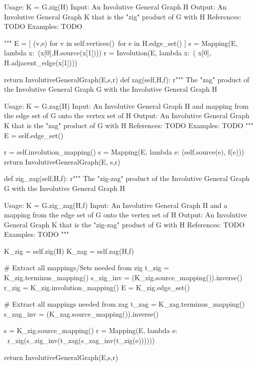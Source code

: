 \begin{sageblock}
        Usage: K = G.zig(H)         
        Input: An Involutive General Graph H
        Output: An Involutive General Graph 
        K that is the "zig" 
        product of G with H
        References: TODO
        Examples: TODO

        """
        E = [ (v,e) for v in self.vertices()\
        for e in H.edge_set() ]
        s = Mapping(E, lambda x:\
        (x[0],H.source(x[1])))
        r = Involution(E, lambda x:\
        ( x[0], H.adjacent_edge(x[1])))

        return InvolutiveGeneralGraph(E,s,r)
    def zag(self,H,f):
        r"""
        The "zag" product of the Involutive 
        General Graph G with the 
        Involutive General Graph H

        Usage: K = G.zag(H)
        Input: An Involutive General Graph H 
        and mapping from the edge set 
        of G onto the vertex set of H
        Output: An Involutive General Graph K 
        that is the "zag" product of 
        G with H
        References: TODO
        Examples: TODO
        """
        E = self.edge_set()
        
        r = self.involution_mapping()
        s = Mapping(E, lambda e: (self.source(e), f(e)))
        return InvolutiveGeneralGraph(E, s,r)
        
    def zig_zag(self,H,f):
        r"""
        The "zig-zag" product of the Involutive 
        General Graph G with the Involutive General Graph H

        Usage: K = G.zig_zag(H,f)
        Input: An Involutive General Graph H 
        and a mapping from the edge set of G onto 
        the vertex set of H
        Output: An Involutive General Graph K 
        that is the "zig-zag" product 
        of G with H
        References: TODO
        Examples: TODO 
        """

        K_zig = self.zig(H)
        K_zag = self.zag(H,f)


        # Extract all mappings/Sets needed from zig
        t_zig = K_zig.terminus_mapping()
        s_zig_inv = (K_zig.source_mapping()).inverse()
        r_zig = K_zig.involution_mapping()
        E = K_zig.edge_set()

        # Extract all mappings needed from zag
        t_zag = K_zag.terminus_mapping()
        s_zag_inv = (K_zag.source_mapping()).inverse()

        s = K_zig.source_mapping()
        r = Mapping(E, lambda e: \
        r_zig(s_zig_inv(t_zag(s_zag_inv(t_zig(e))))))

        return InvolutiveGeneralGraph(E,s,r)
\end{sageblock}

